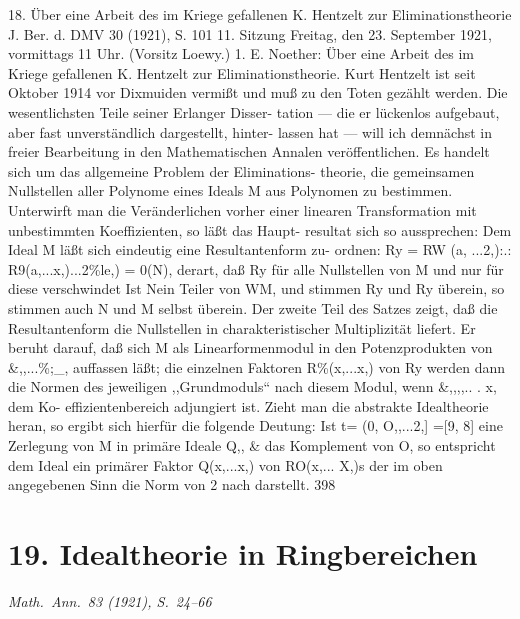 \documentclass[11pt,a4paper]{article}
\theoremstyle{plain}
\theoremstyle{definition}
\begin{document}
\vspace{1em}

18. Über eine Arbeit des im Kriege gefallenen K. Hentzelt 
zur Eliminationstheorie 
J. Ber. d. DMV 
30 (1921), S. 101 
11. Sitzung Freitag, den 23. September 1921, vormittags 11 Uhr. 
(Vorsitz Loewy.) 
1. E. Noether: 
Über eine Arbeit 
des im Kriege gefallenen 
K. Hentzelt zur Eliminationstheorie. 
Kurt Hentzelt ist seit Oktober 1914 vor Dixmuiden vermißt und muß 
zu den Toten gezählt werden. Die wesentlichsten Teile seiner Erlanger Disser- 
tation --- die er lückenlos aufgebaut, aber fast unverständlich dargestellt, hinter- 
lassen hat --- will ich demnächst in freier Bearbeitung in den Mathematischen 
Annalen veröffentlichen. 
Es handelt sich um das allgemeine Problem der Eliminations- 
theorie, 
die gemeinsamen Nullstellen 
aller Polynome eines Ideals M aus 
Polynomen zu bestimmen. 
Unterwirft man die Veränderlichen vorher einer 
linearen Transformation mit unbestimmten Koeffizienten, so läßt das Haupt- 
resultat sich so aussprechen: 
Dem Ideal M läßt sich eindeutig eine Resultantenform 
zu- 
ordnen: Ry 
= RW (a, ...2,):.: R9(a,...x,)...2\%le,) = 0(N), derart, 
daß Ry für alle Nullstellen von M und nur für diese verschwindet 
Ist Nein Teiler von WM, und stimmen Ry und Ry überein, so stimmen 
auch N und M selbst überein. 
Der zweite Teil des Satzes zeigt, daß die Resultantenform die Nullstellen 
in charakteristischer Multiplizität liefert. 
Er beruht darauf, daß sich 
M als Linearformenmodul in den Potenzprodukten von \&,,...\%;\_, auffassen 
läßt; die einzelnen Faktoren R\%(x,...x,) von Ry werden dann die Normen 
des jeweiligen ,,Grundmoduls`` nach diesem Modul, wenn \&,,,,.. 
. x, dem Ko- 
effizientenbereich adjungiert ist. 
Zieht man die abstrakte Idealtheorie heran, 
so ergibt sich hierfür die folgende Deutung: Ist t= (0, O,,...2,] =[9, 8] 
eine Zerlegung von M in primäre Ideale Q,, \& das Komplement von O, so 
entspricht dem Ideal  ein primärer Faktor Q(x,...x,) von RO(x,... X,)s 
der im oben angegebenen Sinn die Norm von 2 nach  darstellt. 
398


\newpage
\section*{19. Idealtheorie in Ringbereichen}
\textit{Math.~Ann.~83 (1921), S.~24--66}

\vspace{1em}
\end{document}
